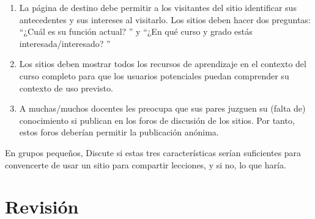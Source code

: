 \begin{enumerate}
 
\item
  La página de destino debe permitir a los visitantes del sitio
identificar sus antecedentes y sus intereses al visitarlo.
Los sitios deben hacer dos preguntas:
``¿Cuál es su función actual? '' y
``¿En qué curso y grado estás interesada/interesado? ''
 
\item
  Los sitios deben mostrar todos los recursos de aprendizaje
en el contexto del curso completo para que los usuarios potenciales puedan comprender
su contexto de uso previsto.
 
\item
  A muchas/muchos docentes les preocupa que sus pares
juzguen su (falta de) conocimiento si publican en los foros de discusión
de los sitios.
Por tanto, estos foros deberían permitir la publicación anónima.
\end{enumerate}

En grupos pequeños,
Discute si estas tres características serían
suficientes para convencerte de usar un sitio para compartir lecciones,
y si no,
lo que haría.

 
\section*{Revisión}
 
